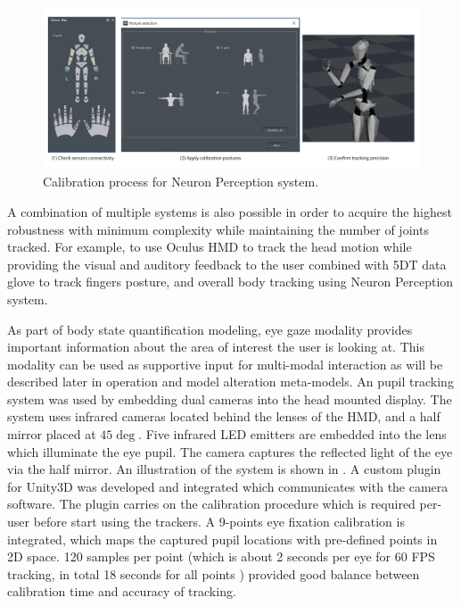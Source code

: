 \begin{figure}[t!]
\centering
\captionsetup{justification=centering} 
\includegraphics[width=1\textwidth]{figures/system/NeuronCalibration.pdf}
\caption{Calibration process for Neuron Perception system.}
  \label{fig:system-neuron-calibration}
\end{figure}



A combination of multiple systems is also possible in order to acquire the highest robustness with minimum complexity while maintaining the number of joints tracked. For example, to use Oculus HMD to track the head motion while providing the visual and auditory feedback to the user combined with 5DT data glove to track fingers posture, and overall body tracking using Neuron Perception system. 

As part of body state quantification modeling, eye gaze modality provides important information about the area of interest the user is looking at. This modality can be used as supportive input for multi-modal interaction as will be described later in operation and model alteration meta-models. An pupil tracking system was used by embedding dual cameras into the head mounted display. The system uses infrared cameras located behind the lenses of the HMD, and a half mirror placed at $45\deg$. Five infrared LED emitters are embedded into the lens which illuminate the eye pupil. The camera captures the reflected light of the eye via the half mirror. An illustration of the system is shown in . A custom plugin for Unity3D was developed and integrated which communicates with the camera software. The plugin carries on the calibration procedure which is required per-user before start using the trackers. A 9-points eye fixation calibration is integrated, which maps the captured pupil locations with pre-defined points in 2D space. 120 samples per point (which is about 2 seconds per eye for 60 FPS tracking, in total 18 seconds for all points ) provided good balance between calibration time and accuracy of tracking.

